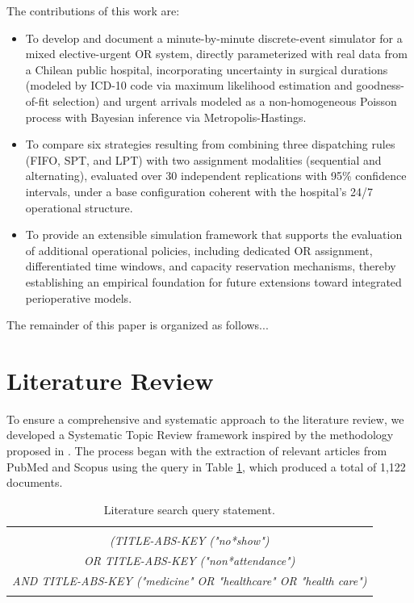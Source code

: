 \documentclass[sn-mathphys-num]{sn-jnl}
\begin{document}
The contributions of this work are:
\begin{itemize}
  \item To develop and document a minute-by-minute discrete-event simulator
  for a mixed elective-urgent OR system, directly parameterized with real data
  from a Chilean public hospital, incorporating uncertainty in surgical
  durations (modeled by ICD-10 code via maximum likelihood estimation and
  goodness-of-fit selection) and urgent arrivals modeled as a non-homogeneous
  Poisson process with Bayesian inference via Metropolis-Hastings.
  \item To compare six strategies resulting from combining three dispatching
  rules (FIFO, SPT, and LPT) with two assignment modalities (sequential and
  alternating), evaluated over 30 independent replications with 95\%
  confidence intervals, under a base configuration coherent with the
  hospital's 24/7 operational structure.
  \item To provide an extensible simulation framework that supports the
  evaluation of additional operational policies, including dedicated OR
  assignment, differentiated time windows, and capacity reservation
  mechanisms, thereby establishing an empirical foundation for future
  extensions toward integrated perioperative models.
\end{itemize}

The remainder of this paper is organized as follows...



\section{Literature Review}

    To ensure a comprehensive and systematic approach to the literature review, we developed a Systematic Topic Review framework inspired by the methodology proposed in \cite{gana2024leveraging}. The process began with the extraction of relevant articles from PubMed and Scopus using the query in Table \ref{tab:query}, which produced a total of 1,122 documents.

    
    \begin{table}[ht]
        \centering
        \caption{Literature search query statement.}
        \label{tab:query}
        \vspace{5pt} %
        \begin{tabular}{@{}|c|@{}}
            \hline
            \\
            \textit{{\color{purple}(TITLE-ABS-KEY (}\;"no*show"{\color{purple}\;)}} \\
            \textit{{\color{purple}OR TITLE-ABS-KEY (}\;"non*attendance"{\color{purple}\;)}} \\
            \textit{{\color{purple}AND TITLE-ABS-KEY (}\;"medicine" OR "healthcare" OR "health care"{\color{purple}\;)}} \\
            \\
            \hline
        \end{tabular}
    \end{table}
    
\end{document}
